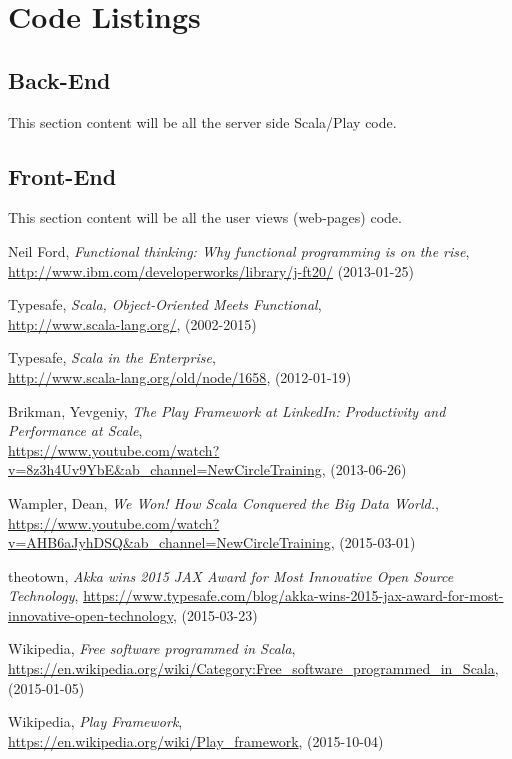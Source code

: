 \documentclass[12pt,twoside,a4paper]{report}
\begin{document}
\appendix
\chapter{Code Listings}
\section{Back-End}
This section content will be all the server side Scala/Play code.

\section{Front-End}
This section content will be all the user views (web-pages) code.

\clearpage
{}

\begin{thebibliography}{99}
Neil Ford,
\emph{Functional thinking: Why functional programming is on the rise},\\
\url{http://www.ibm.com/developerworks/library/j-ft20/}
(2013-01-25)

Typesafe,
\emph{Scala, Object-Oriented Meets Functional},\\
\url{http://www.scala-lang.org/},
(2002-2015)
	
Typesafe,
\emph{Scala in the Enterprise},\\
\url{http://www.scala-lang.org/old/node/1658},
(2012-01-19)

Brikman, Yevgeniy,
\emph{The Play Framework at LinkedIn: Productivity and Performance at Scale},\\
\url{https://www.youtube.com/watch?v=8z3h4Uv9YbE&ab_channel=NewCircleTraining},
(2013-06-26)

Wampler, Dean,
\emph{We Won! How Scala Conquered the Big Data World.},\\
\url{https://www.youtube.com/watch?v=AHB6aJyhDSQ&ab_channel=NewCircleTraining},
(2015-03-01)

theotown,
\emph{Akka wins 2015 JAX Award for Most Innovative Open Source Technology},
\url{https://www.typesafe.com/blog/akka-wins-2015-jax-award-for-most-innovative-open-technology},
(2015-03-23)
	
Wikipedia,
\emph{Free software programmed in Scala},\\
\url{https://en.wikipedia.org/wiki/Category:Free_software_programmed_in_Scala},
(2015-01-05)
	
Wikipedia,
\emph{Play Framework},\\
\url{https://en.wikipedia.org/wiki/Play_framework},
(2015-10-04)
	

\end{thebibliography}
\end{document}
